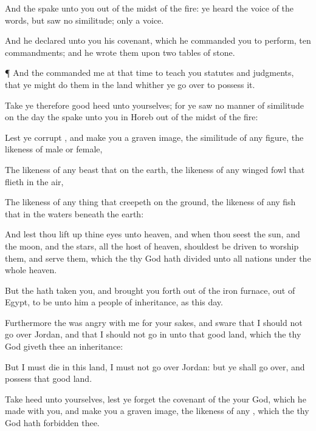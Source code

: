 {And the
{}
spake unto you out of the
midst of the
fire: ye
heard the
voice of the
words, but
saw no
similitude;
only
{} a
voice.

And he
declared unto you his
covenant, which he
commanded you to
perform,
{}
ten
commandments; and he
wrote them upon
two
tables of
stone.


\par }{\PP {}¶ And the
{}
commanded me at that
time to
teach you
statutes and
judgments, that ye might
do them in the
land whither ye go
over to
possess it.

Take ye therefore
good
heed unto
yourselves; for ye
saw no manner of
similitude on the
day
{} the
{}
spake unto you in
Horeb out of the
midst of the
fire:

Lest ye
corrupt
{}, and
make you a graven
image, the
similitude of any
figure, the
likeness of
male or
female,

The
likeness of any
beast that
{} on the
earth, the
likeness of any
winged
fowl that
flieth in the
air,

The
likeness of any thing that
creepeth on the
ground, the
likeness of any
fish that
{} in the
waters
beneath the
earth:

And lest thou lift
up thine
eyes unto
heaven, and when thou
seest the
sun, and the
moon, and the
stars,
{} all the
host of
heaven, shouldest be
driven to
worship them, and
serve them, which the
{} thy
God hath
divided unto all
nations under the whole
heaven.

But the
{} hath
taken you, and brought you
forth out of the
iron
furnace,
{} out of
Egypt, to be unto him a
people of
inheritance, as
{} this
day.

Furthermore the
{} was
angry with me for your
sakes, and
sware that I should not go
over
Jordan, and that I should not
go in unto that
good
land, which the
{} thy
God
giveth thee
{} an
inheritance:

But I must
die in this
land, I must not go
over
Jordan: but ye shall go
over, and
possess that
good
land.

Take
heed unto yourselves, lest ye
forget the
covenant of the
{} your
God, which he
made with you, and
make you a graven
image,
{} the
likeness of
any
{}, which the
{} thy
God hath
forbidden thee.

}
